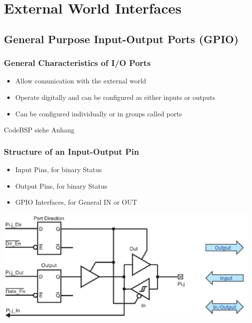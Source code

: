 \section{External World Interfaces }
\subsection{General Purpose Input-Output Ports (GPIO) }
\subsubsection{General Characteristics of I/O Ports}
\begin{itemize}
	\item Allow comunication with the external world
	\item Operate digitally and can be configured as either inputs or outputs
	\item Can be configured individually or in groups called ports
\end{itemize}
CodeBSP siehe Anhang \label{GPIO}
\begin{multicols}{2}
	\subsubsection{Structure of an Input-Output Pin }
	\begin{itemize}
		\item Input Pins, for binary Status
		\item Output Pins, for binary Status
		\item \acs{GPIO} Interfaces, for General IN or OUT
	\end{itemize}	
	\includegraphics[width=\linewidth]{images/IOStructure}  
\end{multicols}

